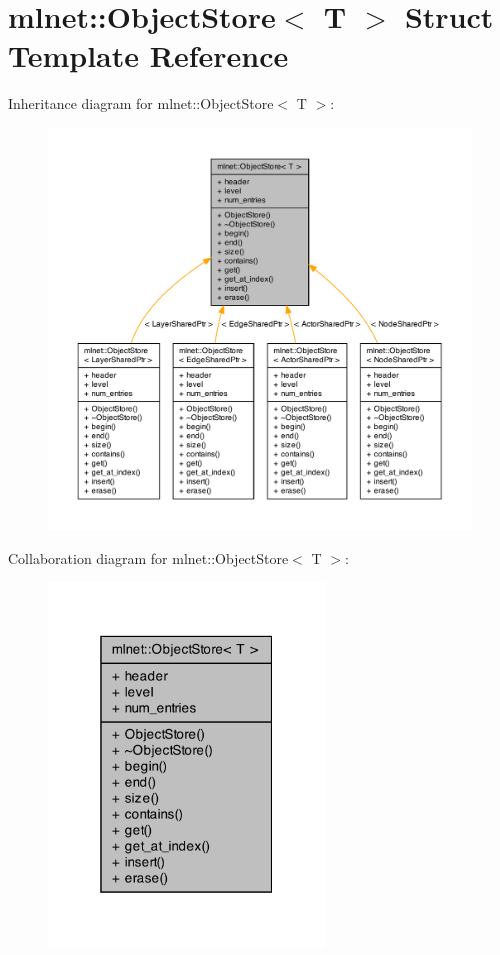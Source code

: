 \hypertarget{structmlnet_1_1_object_store}{\section{mlnet\+:\+:Object\+Store$<$ T $>$ Struct Template Reference}
\label{structmlnet_1_1_object_store}
}


Inheritance diagram for mlnet\+:\+:Object\+Store$<$ T $>$\+:\nopagebreak
\begin{figure}[H]
\begin{center}
\leavevmode
\includegraphics[width=350pt]{structmlnet_1_1_object_store__inherit__graph}
\end{center}
\end{figure}


Collaboration diagram for mlnet\+:\+:Object\+Store$<$ T $>$\+:\nopagebreak
\begin{figure}[H]
\begin{center}
\leavevmode
\includegraphics[width=208pt]{structmlnet_1_1_object_store__coll__graph}
\end{center}
\end{figure}
